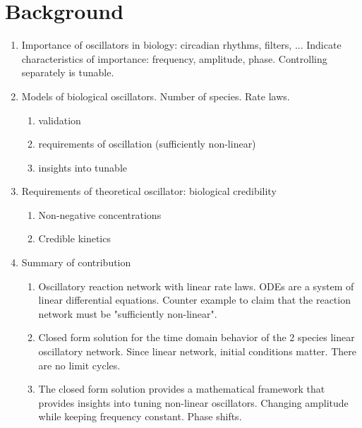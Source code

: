 \documentclass{bmcart}
\begin{document}



\section*{Background}
\begin{enumerate}
\item Importance of oscillators in biology: circadian rhythms, filters, ... Indicate characteristics of importance: frequency, amplitude, phase. Controlling separately is tunable.
\item Models of biological oscillators. Number of species. Rate laws.
   \begin{enumerate}
       \item validation
       \item requirements of oscillation (sufficiently non-linear)
       \item insights into tunable
   \end{enumerate}
\item Requirements of theoretical oscillator: biological credibility
\begin{enumerate}
    \item Non-negative concentrations
    \item Credible kinetics
\end{enumerate}
\item Summary of contribution
\begin{enumerate}
    \item Oscillatory reaction network with linear rate laws. ODEs are a system of linear differential equations. Counter example to claim that the reaction network must be "sufficiently non-linear".
    \item Closed form solution for the time domain behavior of the 2 species linear oscillatory network. Since linear network, initial conditions matter. There are no limit cycles.
    \item The closed form solution provides a mathematical framework that provides insights into tuning non-linear oscillators. Changing amplitude while keeping frequency constant. Phase shifts.
\end{enumerate}

\end{enumerate}
\end{document}
